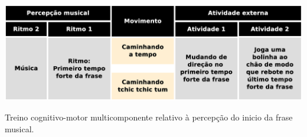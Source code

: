 \begin{table}[!h]
  \centering
    \includegraphics[width=1.0\textwidth]{chapters/cap-body-control/treino-bolinha4.eps}
\caption{Treino cognitivo-motor multicomponente relativo à percepção do inicio da frase musical.}
\label{tab:treino-bolinha4}
\end{table}




